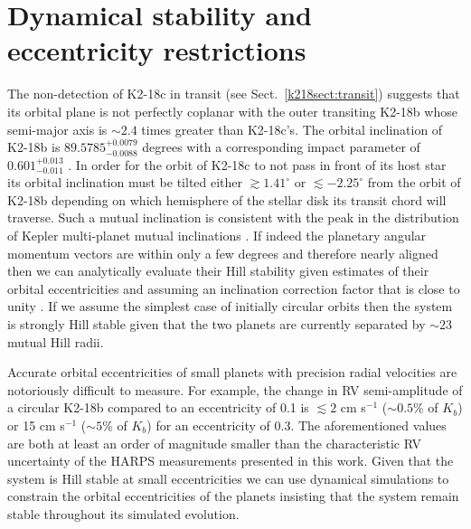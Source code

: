 \section{Dynamical stability and eccentricity restrictions} \label{k218sect:dynam}
The non-detection of K2-18c in transit (see Sect.~\ref{k218sect:transit}) suggests that its orbital plane
is not perfectly coplanar with the outer
transiting K2-18b whose semi-major axis is $\sim 2.4$ times greater than K2-18c's. The orbital inclination
of K2-18b is $89.5785^{+0.0079}_{-0.0088}$ degrees with a corresponding impact parameter
of $0.601^{+0.013}_{-0.011}$ . In order for the orbit of K2-18c
to not pass in front of its host star its orbital inclination must be tilted
either $\gtrsim 1.41^{\circ}$ or $\lesssim -2.25^{\circ}$ from the orbit of K2-18b depending on
which hemisphere of the stellar disk its transit chord will traverse. 
Such a mutual inclination is consistent with the peak in the distribution of Kepler multi-planet
mutual inclinations \citep{figueira12, fabrycky14}.
If indeed the planetary angular momentum vectors are within only a few degrees and therefore
nearly aligned then we can analytically evaluate their Hill stability
given estimates of their orbital eccentricities and assuming an inclination
correction factor that is close to unity \citep{gladman93}. If we assume the simplest case of 
initially circular orbits then the system is strongly Hill stable given that the two planets
are currently separated by $\sim 23$ mutual Hill radii. 


Accurate orbital eccentricities of small planets with precision radial velocities are notoriously
difficult to measure. For example, the change in RV semi-amplitude of a circular K2-18b compared to an
eccentricity of 0.1 is $\lesssim 2$ cm s$^{-1}$ ($\sim 0.5$\% of $K_b$) or 15 cm s$^{-1}$
($\sim 5$\% of $K_b$) for an eccentricity of 0.3. The aforementioned values are both at least an
order of magnitude smaller than the characteristic RV uncertainty of the HARPS measurements
presented in this work. Given that the system is Hill stable at small eccentricities 
we can use dynamical simulations to constrain the orbital eccentricities of the
planets insisting that the system remain stable throughout its simulated evolution. 

